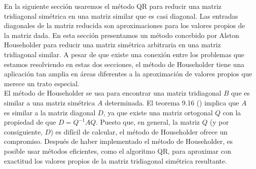En la siguiente sección usaremos el método QR para reducir una matriz tridiagonal simétrica en una matriz similar que es casi diagonal. Las entradas diagonales de la matriz reducida son aproximaciones para los valores propios de la matriz dada. En esta sección presentamos un método concebido por Alston Householder para reducir una matriz simétrica arbitraria en una matriz tridiagonal similar. A pesar de que existe una conexión entre los problemas que estamos resolviendo en estas dos secciones, el método de Householder tiene una aplicación tan amplia en áreas diferentes a la aproximación de valores propios que merece un trato especial.\\
El método de Householder se usa para encontrar una matriz tridiagonal $B$ que es similar a una matriz simétrica $A$ determinada. El teorema 9.16 (\cite{MR2597943}) implica que $A$ es similar a la matriz diagonal $D$, ya que existe una matriz ortogonal $Q$ con la propiedad de que $D=Q^{-1}AQ$. Puesto que, en general, la matriz $Q$ (y por consiguiente, $D$) es difícil de calcular, el método de Householder ofrece un compromiso. Después de haber implementado el método de Householder, es posible usar métodos eficientes, como el algoritmo QR, para aproximar con exactitud los valores propios de la matriz tridiagonal simétrica resultante.
